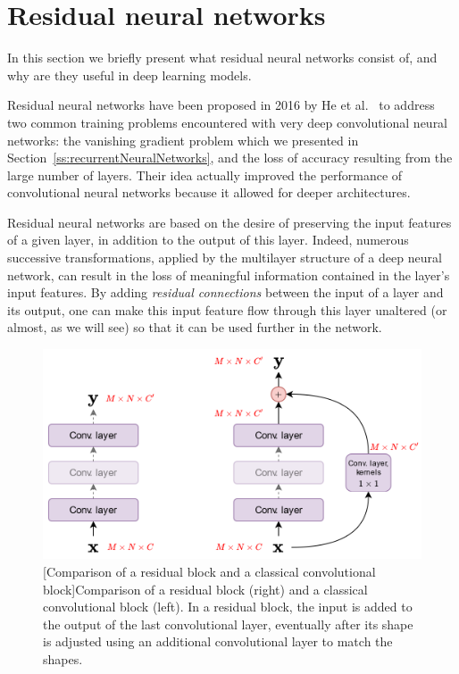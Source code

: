 \section{Residual neural networks}
\label{ss:residualNetworks}

In this section we briefly present what residual neural networks consist of, and why are they useful in deep learning models.

Residual neural networks have been proposed in 2016 by He et al.~\cite{he_deep_2016} to address two common training problems encountered with very deep convolutional neural networks: the vanishing gradient problem which we presented in Section~\ref{ss:recurrentNeuralNetworks}, and the loss of accuracy resulting from the large number of layers. Their idea actually improved the performance of convolutional neural networks because it allowed for deeper architectures.

Residual neural networks are based on the desire of preserving the input features of a given layer, in addition to the output of this layer. Indeed, numerous successive transformations, applied by the multilayer structure of a deep neural network, can result in the loss of meaningful information contained in the layer's input features. By adding \textit{residual connections} between the input of a layer and its output, one can make this input feature flow through this layer unaltered (or almost, as we will see) so that it can be used further in the network.

\begin{figure}[t]
    \begin{center}
    \includegraphics[width=1.\linewidth]{Images/chap3/residualBlock.png}
    [Comparison of a residual block and a classical convolutional block]{Comparison of a residual block (right) and a classical convolutional block (left). In a residual block, the input is added to the output of the last convolutional layer, eventually after its shape is adjusted using an additional convolutional layer to match the shapes.}
    \label{fig:residualBlock}
    \end{center}
\end{figure}

